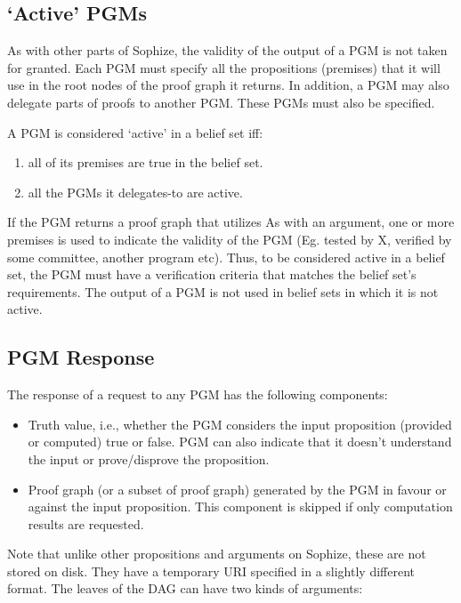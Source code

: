\documentclass[a4paper]{article}
\begin{document}
\subsection{`Active' PGMs}
As with other parts of Sophize, the validity of the output of a PGM is not taken for granted. Each PGM must specify all the propositions (premises) that it will use in the root nodes of the proof graph it returns. In addition, a PGM may also delegate parts of proofs to another PGM. These PGMs must also be specified. 

A PGM is considered `active' in a belief set iff:
\begin{enumerate}
\item all of its premises are true in the belief set.
\item all the PGMs it delegates-to are active.
\end{enumerate}

If the PGM returns a proof graph that utilizes As with an argument, one or more premises is used to indicate the validity of the PGM (Eg. tested by X, verified by some committee, another program etc). Thus, to be considered active in a belief set, the PGM must have a verification criteria that matches the belief set's requirements. The output of a PGM is not used in belief sets in which it is not active.

\subsection{PGM Response}
The response of a request to any PGM has the following components:

\begin{itemize}

\item Truth value, i.e., whether the PGM considers the input proposition (provided or computed) true or false. PGM can also indicate that it doesn't understand the input or prove/disprove the proposition.

\item Proof graph (or a subset of proof graph) generated by the PGM in favour or against the input proposition. This component is skipped if only computation results are requested.
\end{itemize}

Note that unlike other propositions and arguments on Sophize, these are not stored on disk. They have a temporary URI specified in a slightly different format. The leaves of the DAG can have two kinds of arguments:
\end{document}
